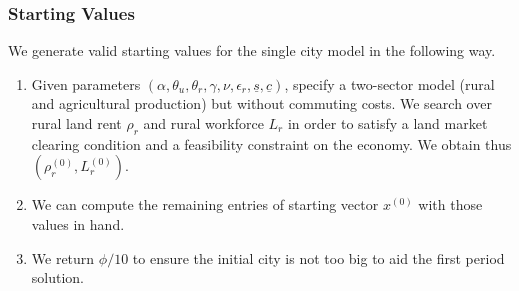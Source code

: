 \documentclass[11pt]{report}
\begin{document}




\subsubsection{Starting Values}\label{B-sec:startvals}

We generate valid starting values for the single city model in the following way. 
\begin{enumerate}
	\item Given parameters $(\alpha,\theta_u, \theta_r, \gamma, \nu, \epsilon_r,\underline{s},\underline{c})$, specify
	a two-sector model (rural and agricultural production) but without commuting costs. We search over rural land rent $\rho_r$ and rural workforce $L_r$
	in order to satisfy a land market clearing condition and a feasibility constraint on the economy. We obtain thus $\left(\rho_r^{(0)}, L_r^{(0)}\right)$.
	\item We can compute the remaining entries of starting vector $x^{(0)}$ with those values in hand.
	\item We return $\phi / 10$ to ensure the initial city is not too big to aid the first period solution.
\end{enumerate}
\end{document}
